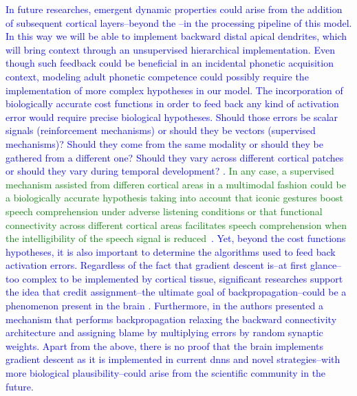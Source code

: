 \documentclass[10pt,letterpaper]{article}
\begin{document}
\textcolor{blue}{In future researches, emergent dynamic properties could arise from the addition of subsequent cortical layers--beyond the --in the processing pipeline of this model.  In this way we will be able to implement backward distal apical dendrites, which will bring context through an unsupervised hierarchical implementation. Even though such feedback could be beneficial in an incidental phonetic acquisition context, modeling adult phonetic competence could possibly require the implementation of more complex hypotheses in our model. The incorporation of biologically accurate cost functions in order to feed back any kind of activation error would require precise biological hypotheses. Should those errors be scalar signals (reinforcement mechanisms) or should they be vectors (supervised mechanisms)? Should they come from the same modality or should they be gathered from a different one? Should they vary across different cortical patches or should they vary during temporal development? \cite{10.3389/fncom.2016.00094}. \textcolor{green}{In any case, a supervised mechanism assisted from differen cortical areas in a multimodal fashion could be a biologically accurate hypothesis taking into account that iconic gestures boost speech comprehension under adverse listening conditions \cite{HOLLE2010875} or that functional connectivity across different cortical areas facilitates speech comprehension when the intelligibility of the speech signal is reduced~\cite{Obleser2283}}. Yet, beyond the cost functions hypotheses, it is also important to determine the algorithms used to feed back activation errors. Regardless of the fact that gradient descent is--at first glance--too complex to be implemented by cortical tissue, significant researches support the idea that credit assignment--the ultimate goal of backpropagation--could be a phenomenon present in the brain \cite{Guerguiev2017TowardsDL}. Furthermore, in \cite{Lillicrap_2016} the authors presented a mechanism that performs backpropagation relaxing the backward connectivity architecture and assigning blame by multiplying errors by random synaptic weights. Apart from the above, there is no proof that the brain implements gradient descent as it is implemented in current \glspl{dnn} and novel strategies--with more biological plausibility--could arise from the scientific community in the future}.
\end{document}
